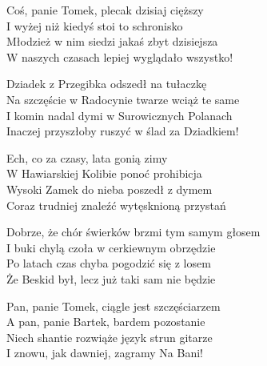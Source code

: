 \begin{text}
    Coś, panie Tomek, plecak dzisiaj cięższy\\
    I wyżej niż kiedyś stoi to schronisko\\
    Młodzież w nim siedzi jakaś zbyt dzisiejsza\\
    W naszych czasach lepiej wyglądało wszystko!

    Dziadek z Przegibka odszedł na tułaczkę\\
    Na szczęście w Radocynie twarze wciąż te same\\
    I komin nadal dymi w Surowicznych Polanach\\
    Inaczej przyszłoby ruszyć w ślad za Dziadkiem!

    Ech, co za czasy, lata gonią zimy\\
    W Hawiarskiej Kolibie ponoć prohibicja\\
    Wysoki Zamek do nieba poszedł z dymem\\
    Coraz trudniej znaleźć wytęsknioną przystań

    Dobrze, że chór świerków brzmi tym samym głosem\\
    I buki chylą czoła w cerkiewnym obrzędzie\\
    Po latach czas chyba pogodzić się z losem\\
    Że Beskid był, lecz już taki sam nie będzie

    Pan, panie Tomek, ciągle jest szczęściarzem\\
    A pan, panie Bartek, bardem pozostanie\\
    Niech shantie rozwiąże język strun gitarze\\
    I znowu, jak dawniej, zagramy Na Bani!
\end{text}